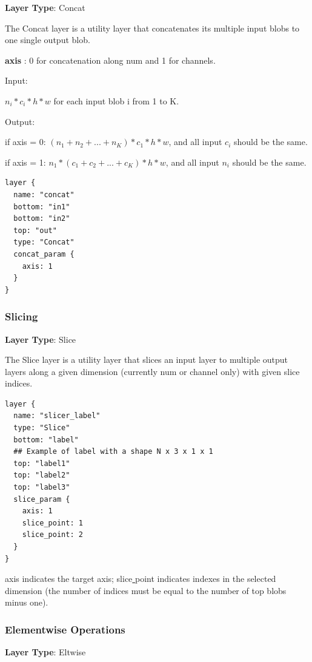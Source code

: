 \documentclass[12pt]{article}
\begin{document}
\noindent \textbf{Layer Type}: Concat

The Concat layer is a utility layer that concatenates its multiple input blobs to one single output blob.

\noindent \textbf{axis }:  0 for concatenation along num and 1 for channels.

\noindent Input:

\noindent $n_i * c_i * h * w$ for each input blob i from 1 to K.

\noindent Output:

\noindent if axis = 0: $(n_{1} + n_{2} + ... + n_{K}) * c_{1} * h * w$, and all input $c_{i}$ should be the same.

\noindent if axis = 1: $n_{1} * (c_{1} + c_{2} + ... + c_{K}) * h * w$, and all input $n_{i}$ should be the same.

\begin{lstlisting}[style=json, frame=single]
layer {
  name: "concat"
  bottom: "in1"
  bottom: "in2"
  top: "out"
  type: "Concat"
  concat_param {
    axis: 1
  }
}
\end{lstlisting}

\subsubsection{Slicing}

\noindent \textbf{Layer Type}: Slice

The Slice layer is a utility layer that slices an input layer to multiple output layers along a given dimension (currently num or channel only) with given slice indices.

\begin{lstlisting}[style=json, frame=single]
layer {
  name: "slicer_label"
  type: "Slice"
  bottom: "label"
  ## Example of label with a shape N x 3 x 1 x 1
  top: "label1"
  top: "label2"
  top: "label3"
  slice_param {
    axis: 1
    slice_point: 1
    slice_point: 2
  }
}
\end{lstlisting}

\noindent axis indicates the target axis; slice\underline{{ }{ }}point indicates indexes in the selected dimension (the number of indices must be equal to the number of top blobs minus one).

\subsubsection{Elementwise Operations}

\noindent \textbf{Layer Type}: Eltwise
\end{document}
